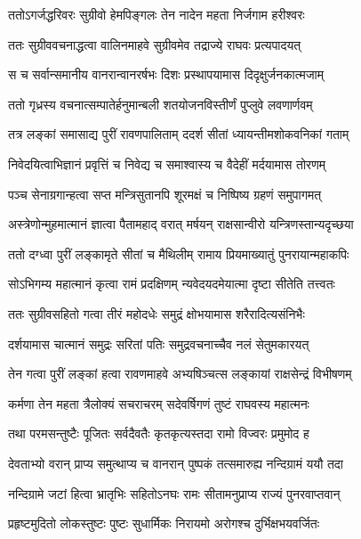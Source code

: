 \twolineshloka
{ततोऽगर्जद्धरिवरः सुग्रीवो हेमपिङ्गलः}
{तेन नादेन महता निर्जगाम हरीश्वरः} %

\twolineshloka
{ततः सुग्रीववचनाद्धत्वा वालिनमाहवे}
{सुग्रीवमेव तद्राज्ये राघवः प्रत्यपादयत्} %

\twolineshloka
{स च सर्वान्समानीय वानरान्वानरर्षभः}
{दिशः प्रस्थापयामास दिदृक्षुर्जनकात्मजाम्} %

\twolineshloka
{ततो गृध्रस्य वचनात्सम्पातेर्हनुमान्बली}
{शतयोजनविस्तीर्णं पुप्लुवे लवणार्णवम्} %

\twolineshloka
{तत्र लङ्कां समासाद्य पुरीं रावणपालिताम्}
{ददर्श सीतां ध्यायन्तीमशोकवनिकां गताम्} %

\twolineshloka
{निवेदयित्वाभिज्ञानं प्रवृत्तिं च निवेद्य च}
{समाश्वास्य च वैदेहीं मर्दयामास तोरणम्} %

\twolineshloka
{पञ्च सेनाग्रगान्हत्वा सप्त मन्त्रिसुतानपि}
{शूरमक्षं च निष्पिष्य ग्रहणं समुपागमत्} %

\twolineshloka
{अस्त्रेणोन्मुहमात्मानं ज्ञात्वा पैतामहाद् वरात्}
{मर्षयन् राक्षसान्वीरो यन्त्रिणस्तान्यदृच्छया} %

\twolineshloka
{ततो दग्ध्वा पुरीं लङ्कामृते सीतां च मैथिलीम्}
{रामाय प्रियमाख्यातुं पुनरायान्महाकपिः} %

\twolineshloka
{सोऽभिगम्य महात्मानं कृत्वा रामं प्रदक्षिणम्}
{न्यवेदयदमेयात्मा दृष्टा सीतेति तत्त्वतः} %

\twolineshloka
{ततः सुग्रीवसहितो गत्वा तीरं महोदधेः}
{समुद्रं क्षोभयामास शरैरादित्यसंनिभैः} %

\twolineshloka
{दर्शयामास चात्मानं समुद्रः सरितां पतिः}
{समुद्रवचनाच्चैव नलं सेतुमकारयत्} %

\twolineshloka
{तेन गत्वा पुरीं लङ्कां हत्वा रावणमाहवे}
{अभ्यषिञ्चत्स लङ्कायां राक्षसेन्द्रं विभीषणम्} %

\twolineshloka
{कर्मणा तेन महता त्रैलोक्यं सचराचरम्}
{सदेवर्षिगणं तुष्टं राघवस्य महात्मनः} %

\twolineshloka
{तथा परमसन्तुष्टैः पूजितः सर्वदैवतैः}
{कृतकृत्यस्तदा रामो विज्वरः प्रमुमोद ह} %

\twolineshloka
{देवताभ्यो वरान् प्राप्य समुत्थाप्य च वानरान्}
{पुष्पकं तत्समारुह्य नन्दिग्रामं ययौ तदा} %

\twolineshloka
{नन्दिग्रामे जटां हित्वा भ्रातृभिः सहितोऽनघः}
{रामः सीतामनुप्राप्य राज्यं पुनरवाप्तवान्} %

\twolineshloka
{प्रहृष्टमुदितो लोकस्तुष्टः पुष्टः सुधार्मिकः}
{निरायमो अरोगश्च दुर्भिक्षभयवर्जितः} %

